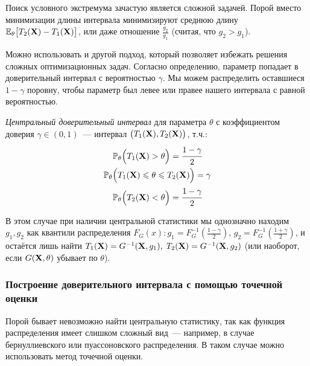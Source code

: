 Поиск условного экстремума зачастую является сложной задачей.
Порой вместо минимизации длины интервала минимизируют среднюю длину $\operatorname{\operatorname{\mathbb{E}}_{\theta}} \bigl[ T_2(\mathbf{X}) - T_1(\mathbf{X}) \bigr]$, 
или даже отношение $\frac{g_2}{g_1}$ (считая, что $g_2 > g_1$).

\vspace{5mm}
Можно использовать и другой подход, который позволяет избежать решения сложных оптимизационных задач.
Согласно определению, параметр попадает в доверительный интервал с вероятностью $\gamma$.
Мы можем распределить оставшиеся $1 - \gamma$ поровну, чтобы параметр был левее или правее нашего интервала с равной вероятностью.

\begin{defn}
    \textit{Центральный доверительный интервал} для параметра $\theta$ с коэффициентом доверия $\gamma \in (0, 1)$~--- 
    интервал $\bigl(T_1(\mathbf{X}), T_2(\mathbf{X})\bigr)$, т.ч.:
    \begin{gather*}
        \operatorname{\operatorname{\mathbb{P}}_{\theta}}\Bigl(T_{1}(\mathbf{X}) > \theta\Bigr)=\cfrac{1-\gamma}{2} \\
        \operatorname{\operatorname{\mathbb{P}}_{\theta}}\Bigl(T_{1}(\mathbf{X}) \leqslant \theta \leqslant T_{2}(\mathbf{X})\Bigr)=\gamma \\
        \operatorname{\operatorname{\mathbb{P}}_{\theta}}\Bigl(T_{2}(\mathbf{X}) < \theta\Bigr)=\cfrac{1-\gamma}{2}
    \end{gather*}
\end{defn}

В этом случае при наличии центральной статистики мы однозначно находим $g_1, g_2$ как квантили распределения $F_G(x)\colon g_1 = F_G^{-1}\left(\frac{1 - \gamma}{2}\right), \, g_2 = F_G^{-1}\left(\frac{1 + \gamma}{2}\right)$, 
и остаётся лишь найти $T_1(\mathbf{X}) = G^{-1}(\mathbf{X}, g_1), \; T_2(\mathbf{X}) = G^{-1}(\mathbf{X}, g_2)$ (или наоборот, если $G(\mathbf{X}, \theta)$ убывает по $\theta$).

\subsubsection{Построение доверительного интервала с помощью точечной оценки}
Порой бывает невозможно найти центральную статистику, так как функция распределения имеет слишком сложный вид~--- 
например, в случае бернуллиевского или пуассоновского распределения.
В таком случае можно использовать метод точечной оценки.

